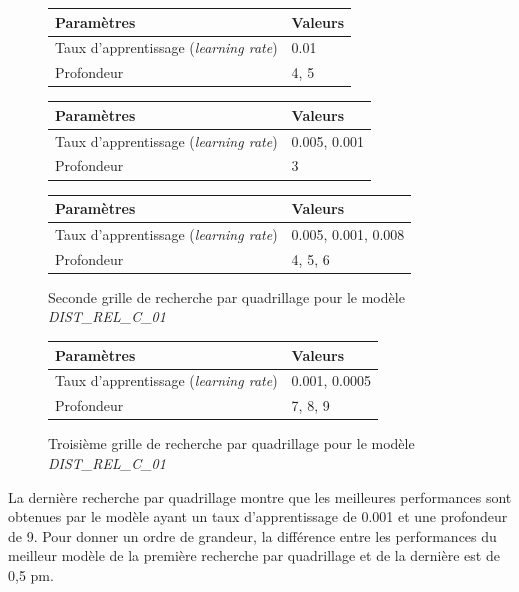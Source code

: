 \begin{figure}[!h]
	\centering
	
	\begin{tabular}{|l|l|}
		\hline
		\textbf{Paramètres} & \textbf{Valeurs} \\ \hline 
		Taux d'apprentissage (\emph{learning rate}) & 0.01\\ \hline
		Profondeur & 4, 5 \\ \hline
	\end{tabular}	
	
	\vspace{0.5cm}	
	
	\begin{tabular}{|l|l|}
		\hline
		\textbf{Paramètres} & \textbf{Valeurs} \\ \hline 
		Taux d'apprentissage (\emph{learning rate})& 0.005, 0.001\\ \hline
		Profondeur & 3 \\ \hline
	\end{tabular}
	
	\vspace{0.5cm}	

	\begin{tabular}{|l|l|}
		\hline
		\textbf{Paramètres} & \textbf{Valeurs} \\ \hline 
		Taux d'apprentissage (\emph{learning rate})& 0.005, 0.001, 0.008\\ \hline
		Profondeur & 4, 5, 6 \\ \hline
	\end{tabular}		
	\caption{Seconde grille de recherche par quadrillage pour le modèle \emph{DIST\_REL\_C\_01}}
\end{figure}
              
\begin{figure}[!h]
	\centering
	\begin{tabular}{|l|l|}
		\hline
		\textbf{Paramètres} & \textbf{Valeurs} \\ \hline 
		Taux d'apprentissage (\emph{learning rate}) & 0.001, 0.0005\\ \hline
		Profondeur & 7, 8, 9\\ \hline
	\end{tabular}	
	
	\caption{Troisième grille de recherche par quadrillage pour le modèle \emph{DIST\_REL\_C\_01}}
\end{figure}

\par La dernière recherche par quadrillage montre que les meilleures performances sont obtenues par le modèle ayant un taux d'apprentissage de 0.001 et une profondeur de 9. Pour donner un ordre de grandeur, la différence entre les performances du meilleur modèle de la première recherche par quadrillage et de la dernière est de 0,5 pm.


